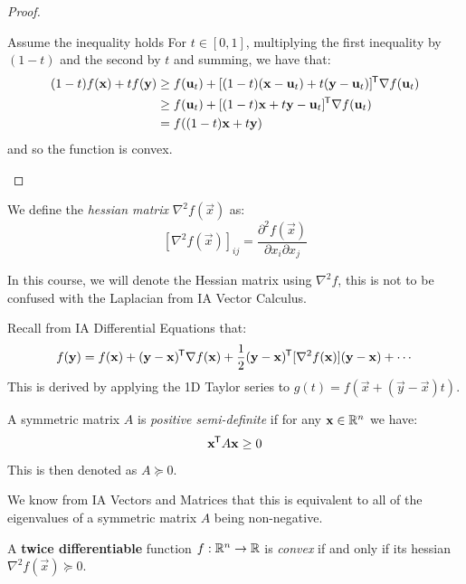 \documentclass[../main.tex]{subfiles}
\begin{document}
\begin{proof}
\begin{proofdirection}{Assume the inequality holds}
    For $t \in [0, 1]$, multiplying the first inequality by $(1 - t)$ and the second by $t$ and summing, we have that:
    \begin{align*}
      (1 - t)f(\mathbf{\bm{x}}) + tf(\mathbf{\bm{y}}) &\geq f(\mathbf{\bm{u}}_t) + [(1 - t)(\mathbf{\bm{x}} - \mathbf{\bm{u}}_t) + t(\mathbf{\bm{y}} - \mathbf{\bm{u}}_t)]^{{\mkern-1.5mu\mathsf{T}}} \nabla f(\mathbf{\bm{u}}_t) \\
                                      &\geq f(\mathbf{\bm{u}}_t) + [(1 - t)\mathbf{\bm{x}} + t\mathbf{\bm{y}} - \mathbf{\bm{u}}_t]^{{\mkern-1.5mu\mathsf{T}}} \nabla f(\mathbf{\bm{u}}_t) \\
                                      &= f((1 - t)\mathbf{\bm{x}} + t\mathbf{\bm{y}})
    \end{align*}
    and so the function is convex.
  \end{proofdirection}
\end{proof}
\begin{definition}[Hessian]
  We define the \textit{hessian matrix} $\nabla^2 f(\vec{x})$ as:
  \[
    [\nabla^2 f(\vec{x})]_{i j} = \frac{\partial^2 f(\vec{x})}{\partial x_i \partial x_j}
  \]
\end{definition}
\begin{remark}[Notation]
  In this course, we will denote the Hessian matrix using $\nabla^2 f$, this is not to be confused with the Laplacian from IA Vector Calculus.
\end{remark}
\begin{remark}[Recap]
  Recall from IA Differential Equations that:
  \[
    f(\mathbf{\bm{y}}) = f(\mathbf{\bm{x}}) + (\mathbf{\bm{y}} - \mathbf{\bm{x}})^{{\mkern-1.5mu\mathsf{T}}} \nabla f(\mathbf{\bm{x}}) + \frac{1}{2}(\mathbf{\bm{y}} - \mathbf{\bm{x}})^{{\mkern-1.5mu\mathsf{T}}} [\nabla^2 f(\mathbf{\bm{x}})] (\mathbf{\bm{y}} - \mathbf{\bm{x}}) + \cdots
  \]
  This is derived by applying the 1D Taylor series to $g(t) = f(\vec{x} + (\vec{y} - \vec{x})t)$.
\end{remark}
\begin{definition}
  A symmetric matrix $A$ is \textit{positive semi-definite} if for any $\mathbf{\bm{x}} \in \mathbb{R}^{n}$ we have:
  \[
    \mathbf{\bm{x}}^{{\mkern-1.5mu\mathsf{T}}} A \mathbf{\bm{x}} \geq 0
  \]
  This is then denoted as $A \succeq 0$.
\end{definition}
\begin{remark}
  We know from IA Vectors and Matrices that this is equivalent to all of the eigenvalues of a symmetric matrix $A$ being non-negative.
\end{remark}
\begin{theorem}
  A \textbf{twice differentiable} function $f: \mathbb{R}^{n} \to \mathbb{R}$ is \textit{convex} if and only if its hessian $\nabla^2 f(\vec{x}) \succeq 0$.
\end{theorem}
\end{document}
